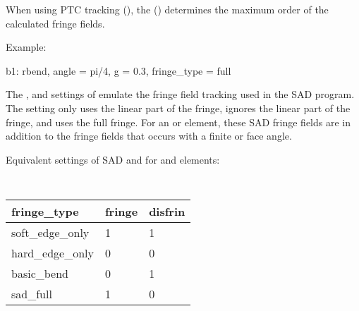 {When using PTC tracking (), the 
() determines the maximum order of the calculated fringe fields.

Example:
\begin{example}
  b1: rbend, angle = pi/4, g = 0.3, fringe_type = full
\end{example}

The ,  and  settings of  emulate
the fringe field tracking used in the SAD program\cite{b:sad}.  The  setting only
uses the linear part of the fringe,  ignores the linear part of the fringe, and
 uses the full fringe.  For an  or  element, these SAD fringe
fields are in addition to the fringe fields that occurs with a finite  or  face angle.

Equivalent settings of SAD  and  for  and  elements:
\newline\hspace*{0.1in}
{ \tt
\begin{tabular}{lll}
  fringe_type       & fringe & disfrin \\ \midrule
  soft_edge_only    &  1     & 1       \\
  hard_edge_only    &  0     & 0       \\
  basic_bend        &  0     & 1       \\
  sad_full          &  1     & 0       \\
  \bottomrule
\end{tabular}
}

}
